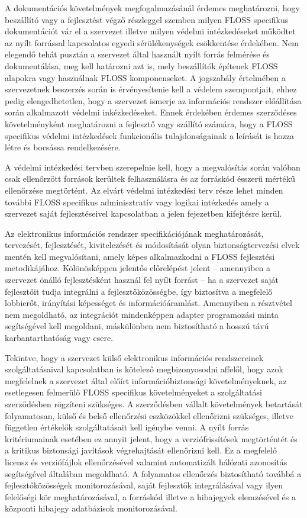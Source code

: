 \documentclass[12pt,magyar,a4paper,oneside]{scrreprt}
\begin{document}
A dokumentációs követelmények megfogalmazásánál érdemes meghatározni,
hogy beszállító vagy a fejlesztést végző részleggel szemben milyen FLOSS
specifikus dokumentációt vár el a szervezet illetve milyen védelmi
intézkedéseket működtet az nyílt forrással kapcsolatos egyedi
sérülékenységek csökkentése érdekében. Nem elegendő tehát pusztán a
szervezet által használt nyílt forrás felmérése és dokumentálása, meg
kell határozni azt is, mely beszállítók építenek FLOSS alapokra vagy
használnak FLOSS komponenseket. A jogszabály értelmében a szervezetnek
beszerzés során is érvényesítenie kell a védelem szempontjait, ehhez
pedig elengedhetetlen, hogy a szervezet ismerje az információs rendszer
előállítása során alkalmazott védelmi inkézkedéseket. Ennek érdekében
érdemes szerződéses követelményként meghatározni a fejlesztő vagy
szállító számára, hogy a FLOSS specifikus védelmi intézkedések
funkcionális tulajdonságainak a leírását is hozza létre és bocsássa
rendelkezésére.

A védelmi intézkedési tervben szerepelnie kell, hogy a megvalósítás
során valóban csak ellenőrzött források kerültek felhasználásra és az
forráskód ésszerű mértékű ellenőrzése megtörtént. Az elvárt védelmi
intézkedési terv része lehet minden további FLOSS specifikus
adminisztratív vagy logikai intézkedés amely a szervezet saját
fejlesztéseivel kapcsolatban a jelen fejezetben kifejtésre kerül.

Az elektronikus információs rendszer specifikációjának meghatározását,
tervezését, fejlesztését, kivitelezését és módosítását olyan
biztonságtervezési elvek mentén kell megvalósítani, amely képes
alkalmazkodni a FLOSS fejlesztési metodikájához. Kölönösképpen jelentős
előrelépést jelent -- amennyiben a szervezet önálló fejlesztésként
használ fel nyílt forrást -- ha a szervezet saját fejlesztőit tudja
integrálni a fejlesztőközösségbe, így biztosítva a megfelelő lobbierőt,
irányítási képességet és információáramlást. Amennyiben a résztvétel nem
megoldható, az integrációt mindenképpen adapter programozási minta
segítségével kell megoldani, máskülönben nem biztosítható a hosszú távú
karbantarthatóság vagy csere.

Tekintve, hogy a szervezet külső elektronikus információs rendszereinek
szolgáltatásaival kapcsolatban is kötelező megbizonyosodni affelől, hogy
azok megfelelnek a szervezet által előírt információbiztonsági
követelményeknek, az esetlegesen felmerülő FLOSS specifikus
követelményeket a szolgáltatási szerződésben rögzíteni szükséges. A
szerződésben vállalt követelmények betartását folyamatosan, külső és
belső ellenőrzési eszközökkel ellenőrizni szükséges, illetve független
értékelők szolgáltatásait kell igénybe venni. A nyílt forrás
kritériumainak esetében ez annyit jelent, hogy a verziófrissítések
megtörténtét és a kritikus biztonsági javítások végrehajtását
ellenőrizni kell. Ez a megfelelő licensz és verziófájlok ellenőrzésével
valamint automatizált hálózati azonosítás segítségével általában
megoldható. A folyamatos ellenőrzés biztosítható továbbá a
fejlesztőközösségek monitorozásával, saját fejlesztők integrálásával
vagy ilyen felelőségi kör meghatározásával, a forráskód illetve a
hibajegyek elemzésével és a központi hibajegy adatbázisok
monitorozásával.
\end{document}
